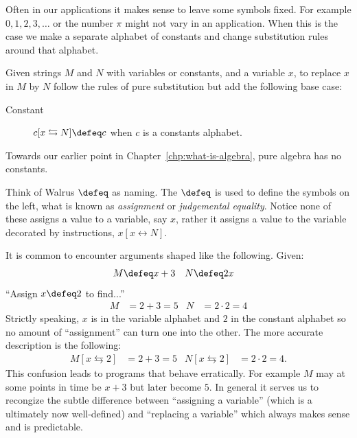 Often in our applications it makes sense to leave some symbols fixed.
For example $0,1,2,3,\ldots$ or the number $\pi$ might not vary in an application.
When this is the case we make a separate alphabet of constants and change substitution 
rules around that alphabet.
\begin{definition}
    Given strings $M$ and $N$ with variables or constants, 
    and a variable $x$, to replace $x$ in $M$ by $N$ 
    follow the rules of pure substitution but add the following  base case:
    \begin{description}
        \item[Constant] $c[x\leftrightarrows N]\defeq c$ when $c$ is a constants alphabet. 
    \end{description}
\end{definition}

Towards our earlier point in Chapter~\ref{chp:what-is-algebra}, pure algebra has no constants.

\begin{remark}
    Think of Walrus $\defeq$ as  naming.
    The $\defeq$ is used to define the symbols on the left, what is 
    known as \emph{assignment} or \emph{judgemental equality}.  Notice none of 
    these assigns a value to a variable, say $x$, rather it assigns a value to the variable 
    decorated by instructions, $x[x\leftrightarrow N]$.  
    
    It is common to encounter arguments shaped like the following.  Given:
    \begin{align*}
        M & \defeq x+3 & N & \defeq 2x
    \end{align*}
    ``Assign $x \defeq 2$ to find...''
    \begin{align*}
        M  & = 2+3 =5 & N & = 2\cdot 2 =4
    \end{align*}
    Strictly speaking, $x$ is in the variable alphabet and $2$ in the constant 
    alphabet so no amount of ``assignment'' can turn one into the other.
    The more accurate description is the following:
    \begin{align*}
        M[x\leftrightarrows 2] & = 2+3=5 & N[x\leftrightarrows 2] & = 2\cdot 2=4.
    \end{align*}
    This confusion leads to programs that behave erratically. For example $M$
    may at some points in time be $x+3$ but later become $5$. In general it
    serves us to recongize the subtle difference between ``assigning a
    variable'' (which is a ultimately now well-defined) 
    and ``replacing a variable'' which always makes sense and is predictable.
\end{remark}

